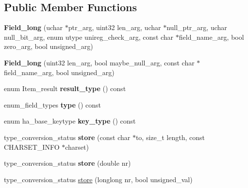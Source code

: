 \subsection*{Public Member Functions}
\begin{DoxyCompactItemize}
\item 
\mbox{\label{classField__long_a6c9c39a0d1a18a0ff76f56f8eb3981cb}} 
{\bfseries Field\+\_\+long} (uchar $\ast$ptr\+\_\+arg, uint32 len\+\_\+arg, uchar $\ast$null\+\_\+ptr\+\_\+arg, uchar null\+\_\+bit\+\_\+arg, enum utype unireg\+\_\+check\+\_\+arg, const char $\ast$field\+\_\+name\+\_\+arg, bool zero\+\_\+arg, bool unsigned\+\_\+arg)
\item 
\mbox{\label{classField__long_aac0c0a26adea806821da8a04e64132e7}} 
{\bfseries Field\+\_\+long} (uint32 len\+\_\+arg, bool maybe\+\_\+null\+\_\+arg, const char $\ast$field\+\_\+name\+\_\+arg, bool unsigned\+\_\+arg)
\item 
\mbox{\label{classField__long_aa926992b64d0dcd3a1c0fee480810a9f}} 
enum Item\+\_\+result {\bfseries result\+\_\+type} () const
\item 
\mbox{\label{classField__long_a68f2e6598242a604155e9d81ce6c05f6}} 
enum\+\_\+field\+\_\+types {\bfseries type} () const
\item 
\mbox{\label{classField__long_a94dc76a7469618435e6eeedd2b290aba}} 
enum ha\+\_\+base\+\_\+keytype {\bfseries key\+\_\+type} () const
\item 
\mbox{\label{classField__long_a31b57dd8ee1fa4a810ca65e5bd6147b3}} 
type\+\_\+conversion\+\_\+status {\bfseries store} (const char $\ast$to, size\+\_\+t length, const C\+H\+A\+R\+S\+E\+T\+\_\+\+I\+N\+FO $\ast$charset)
\item 
\mbox{\label{classField__long_ab749f43436b135e2913727468ea594af}} 
type\+\_\+conversion\+\_\+status {\bfseries store} (double nr)
\item 
type\+\_\+conversion\+\_\+status \mbox{\hyperlink{classField__long_a32635a2020febffbd53ac8ff1e7b74f2}{store}} (longlong nr, bool unsigned\+\_\+val)
\item 
\mbox{\label{classField__long_afc181405f5ee383422d19de65c3e0c7b}} 

\end{DoxyCompactItemize}
